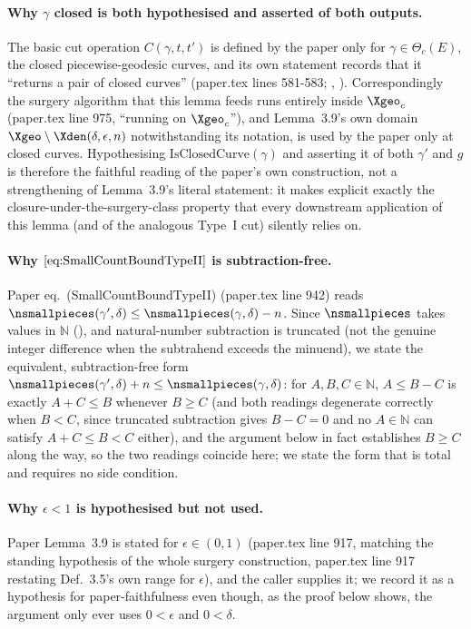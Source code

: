 \begin{lemma}
  \paragraph{Why $\gamma$ closed is both hypothesised and asserted of both outputs.} The basic cut
  operation $C(\gamma,t,t')$ is defined by the paper only for $\gamma \in \Theta_c(E)$, the closed
  piecewise-geodesic curves, and its own statement records that it ``returns a pair of closed
  curves'' (paper.tex lines 581-583; , ). Correspondingly
  the surgery algorithm that this lemma feeds runs entirely inside $\Xgeo_c$ (paper.tex line 975,
  ``running on $\Xgeo_c$''), and Lemma~3.9's own domain $\Xgeo\setminus\Xden(\delta,\epsilon,n)$
  notwithstanding its notation, is used by the paper only at closed curves. Hypothesising
  $\mathrm{IsClosedCurve}(\gamma)$ and asserting it of both $\gamma'$ and $g$ is therefore the
  faithful reading of the paper's own construction, not a strengthening of Lemma~3.9's literal
  statement: it makes explicit exactly the closure-under-the-surgery-class property that every
  downstream application of this lemma (and of the analogous Type~I cut) silently relies on.

  \paragraph{Why $\eqref{eq:SmallCountBoundTypeII}$ is subtraction-free.} Paper eq.~(SmallCountBoundTypeII)
  (paper.tex line 942) reads $\nsmallpieces(\gamma',\delta) \le \nsmallpieces(\gamma,\delta) - n$.
  Since $\nsmallpieces$ takes values in $\mathbb{N}$ (), and natural-number
  subtraction is truncated (not the genuine integer difference when the subtrahend exceeds the
  minuend), we state the equivalent, subtraction-free form $\nsmallpieces(\gamma',\delta)+n \le
  \nsmallpieces(\gamma,\delta)$: for $A,B,C \in \mathbb{N}$, $A \le B - C$ is exactly $A + C \le B$
  whenever $B \ge C$ (and both readings degenerate correctly when $B<C$, since truncated
  subtraction gives $B-C=0$ and no $A\in\mathbb{N}$ can satisfy $A+C\le B<C$ either), and the
  argument below in fact establishes $B \ge C$ along the way, so the two readings coincide here;
  we state the form that is total and requires no side condition.

  \paragraph{Why $\epsilon<1$ is hypothesised but not used.} Paper Lemma~3.9 is stated for $\epsilon
  \in (0,1)$ (paper.tex line 917, matching the standing hypothesis of the whole surgery
  construction, paper.tex line 917 restating Def.~3.5's own range for $\epsilon$), and the caller
   supplies it; we record it as a hypothesis for paper-faithfulness even
  though, as the proof below shows, the argument only ever uses $0<\epsilon$ and $0<\delta$.
\end{lemma}
